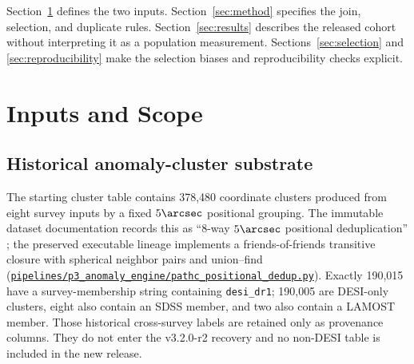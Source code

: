 \documentclass[twocolumn]{aastex701}
\newcommand{\repoBase}{https://github.com/Hubify-Projects/bigbounce/blob/main}
\newcommand{\artifact}[1]{\href{\repoBase/#1}{\nolinkurl{#1}}}
\newcommand{\releaseVersion}{v3.2.0-r2}
\begin{document}
Section~\ref{sec:data} defines the two inputs.  Section~\ref{sec:method} specifies the join,
selection, and duplicate rules.  Section~\ref{sec:results} describes the released cohort without
interpreting it as a population measurement.  Sections~\ref{sec:selection} and
\ref{sec:reproducibility} make the selection biases and reproducibility checks explicit.

\section{Inputs and Scope}\label{sec:data}

\subsection{Historical anomaly-cluster substrate}\label{sec:anomaly-input}

The starting cluster table contains 378,480 coordinate clusters produced from eight survey
inputs by a fixed $5\arcsec$ positional grouping.  The immutable dataset documentation records
this as ``8-way $5\arcsec$ positional deduplication'' \citep{Golden2026Data}; the preserved
executable lineage implements a friends-of-friends transitive closure with spherical neighbor
pairs and union--find
(\artifact{pipelines/p3\_anomaly\_engine/pathc\_positional\_dedup.py}).  Exactly 190,015 have a
survey-membership string containing \texttt{desi\_dr1};
190,005 are DESI-only clusters, eight also contain an SDSS member, and two also contain a LAMOST
member.  Those historical cross-survey labels are retained only as provenance columns.  They do
not enter the \releaseVersion{} recovery and no non-DESI table is included in the new release.
\end{document}
